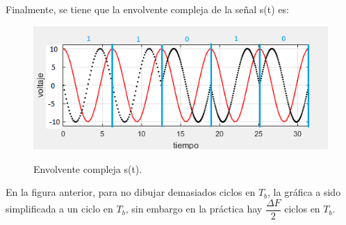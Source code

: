 \begin{itemize}

Finalmente, se tiene que la envolvente compleja de la se\~nal s(t) es: 

\begin{figure}[h!]
	\captionsetup{justification = raggedright, singlelinecheck = false}
    \caption{Envolvente compleja s(t).}
    \centering
    \includegraphics[width=1\textwidth]{Imagenes/13.png}
    \label{fig:dos-senos}
\end{figure}

 
En la figura anterior, para no dibujar demasiados ciclos en $T_{b}$, la gr\'afica a sido simplificada a un ciclo en $T_{b}$, sin embargo en la pr\'actica hay $ \dfrac{\Delta F}{2} $ ciclos en $T_{b}$.
\end{itemize}